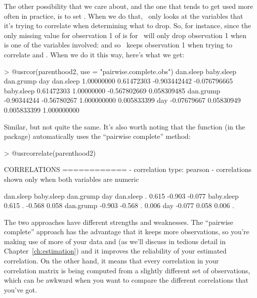 The other possibility that we care about, and the one that tends to get used more often in practice, is to set . When we do that, \R\ only looks at the variables that it's trying to correlate when determining what to drop. So, for instance, since the only missing value for observation 1 of  is for  \R\ will only drop observation 1 when  is one of the variables involved: and so \R\ keeps observation 1 when trying to correlate   and . When we do it this way, here's what we get:
\begin{rblock1}
> @usr{cor(parenthood2, use = "pairwise.complete.obs")} 
             dan.sleep  baby.sleep    dan.grump          day
dan.sleep   1.00000000  0.61472303 -0.903442442 -0.076796665
baby.sleep  0.61472303  1.00000000 -0.567802669  0.058309485
dan.grump  -0.90344244 -0.56780267  1.000000000  0.005833399
day        -0.07679667  0.05830949  0.005833399  1.000000000
\end{rblock1}
Similar, but not quite the same. It's also worth noting that the  function (in the  package) automatically uses the ``pairwise complete'' method:
\begin{rblock1}
> @usr{correlate(parenthood2)}

CORRELATIONS
============
- correlation type:  pearson 
- correlations shown only when both variables are numeric

           dan.sleep baby.sleep dan.grump    day
dan.sleep          .      0.615    -0.903 -0.077
baby.sleep     0.615          .    -0.568  0.058
dan.grump     -0.903     -0.568         .  0.006
day           -0.077      0.058     0.006      .
\end{rblock1}

The two approaches have different strengths and weaknesses. The ``pairwise complete'' approach has the advantage that it keeps more observations, so you're making use of more of your data and (as we'll discuss in tedious detail in Chapter~\ref{ch:estimation}) and it improves the reliability of your estimated correlation. On the other hand, it means that every correlation in your correlation matrix is being computed from a slightly different set of observations, which can be awkward when you want to compare the different correlations that you've got. 
 
